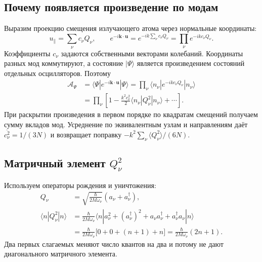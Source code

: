 \documentclass[../final.tex]{subfiles}
\begin{document}
\subsection{Почему появляется произведение по модам}
Выразим проекцию смещения излучающего атома через нормальные координаты:
\begin{equation*}
 u_\parallel=\sum_\nu c_\nu Q_\nu,\qquad
 e^{-i\mathbf k\cdot\mathbf u}
 =e^{-ik\sum_\nu c_\nu Q_\nu}
 =\prod_\nu e^{-ikc_\nu Q_\nu}.
\end{equation*}
Коэффициенты $c_\nu$ задаются собственными векторами колебаний.
Координаты разных мод коммутируют, а состояние $|\Psi\rangle$
является произведением состояний отдельных осцилляторов. Поэтому
\begin{align*}
 \mathcal A_\Psi
 &=\langle\Psi|e^{-i\mathbf k\cdot\mathbf u}|\Psi\rangle
 =\prod_\nu\langle n_\nu|e^{-ikc_\nu Q_\nu}|n_\nu\rangle\\
 &=\prod_\nu\left[1-\frac{k^2c_\nu^2}{2}
 \langle n_\nu|Q_\nu^2|n_\nu\rangle+\cdots\right].
\end{align*}
При раскрытии произведения в первом порядке по квадратам смещений
получаем сумму вкладов мод. Усреднение по эквивалентным узлам
и направлениям даёт $\overline{c_\nu^2}=1/(3N)$ и возвращает
поправку $-k^2\sum_\nu\langle Q_\nu^2\rangle/(6N)$.

\clearpage
\subsection{Матричный элемент $Q_\nu^2$}
Используем операторы рождения и уничтожения:
\begin{align*}
 Q_\nu&=\sqrt{\frac\hbar{2M\omega_\nu}}(a_\nu+a_\nu^\dagger),\\
 \langle n|Q_\nu^2|n\rangle
 &=\frac\hbar{2M\omega_\nu}
 \langle n|a_\nu^2+(a_\nu^\dagger)^2
 +a_\nu a_\nu^\dagger+a_\nu^\dagger a_\nu|n\rangle\\
 &=\frac\hbar{2M\omega_\nu}\bigl[0+0+(n+1)+n\bigr]
 =\frac\hbar{2M\omega_\nu}(2n+1).
\end{align*}
Два первых слагаемых меняют число квантов на два и потому не дают
диагонального матричного элемента.
\end{document}
